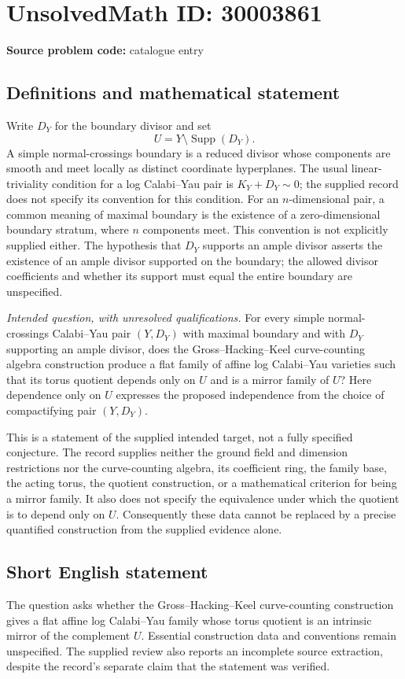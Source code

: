 \documentclass[11pt]{article}
\begin{document}
\section*{UnsolvedMath ID: 30003861}
\textbf{Source problem code:} catalogue entry
\subsection{Definitions and mathematical statement}
Write \(D_Y\) for the boundary divisor and set
\[
U=Y\setminus\operatorname{Supp}(D_Y).
\]
A simple normal-crossings boundary is a reduced divisor whose components are smooth and meet locally as distinct coordinate hyperplanes. The usual linear-triviality condition for a log Calabi--Yau pair is \(K_Y+D_Y\sim 0\); the supplied record does not specify its convention for this condition. For an \(n\)-dimensional pair, a common meaning of maximal boundary is the existence of a zero-dimensional boundary stratum, where \(n\) components meet. This convention is not explicitly supplied either. The hypothesis that \(D_Y\) supports an ample divisor asserts the existence of an ample divisor supported on the boundary; the allowed divisor coefficients and whether its support must equal the entire boundary are unspecified.

\emph{Intended question, with unresolved qualifications.} For every simple normal-crossings Calabi--Yau pair \((Y,D_Y)\) with maximal boundary and with \(D_Y\) supporting an ample divisor, does the Gross--Hacking--Keel curve-counting algebra construction produce a flat family of affine log Calabi--Yau varieties such that its torus quotient depends only on \(U\) and is a mirror family of \(U\)? Here dependence only on \(U\) expresses the proposed independence from the choice of compactifying pair \((Y,D_Y)\).

This is a statement of the supplied intended target, not a fully specified conjecture. The record supplies neither the ground field and dimension restrictions nor the curve-counting algebra, its coefficient ring, the family base, the acting torus, the quotient construction, or a mathematical criterion for being a mirror family. It also does not specify the equivalence under which the quotient is to depend only on \(U\). Consequently these data cannot be replaced by a precise quantified construction from the supplied evidence alone.
\subsection{Short English statement}
The question asks whether the Gross--Hacking--Keel curve-counting construction gives a flat affine log Calabi--Yau family whose torus quotient is an intrinsic mirror of the complement \(U\). Essential construction data and conventions remain unspecified. The supplied review also reports an incomplete source extraction, despite the record's separate claim that the statement was verified.
\end{document}
